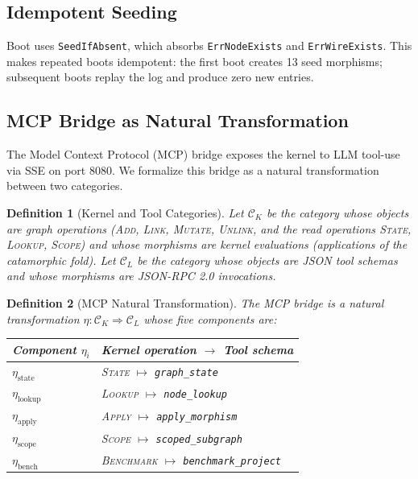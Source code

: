 \documentclass[submission,copyright,creativecommons]{eptcs}
\newtheorem{definition}{Definition}
\begin{document}
\subsection{Idempotent Seeding}

Boot uses \texttt{SeedIfAbsent}, which absorbs \texttt{ErrNodeExists} and
\texttt{ErrWireExists}. This makes repeated boots idempotent: the first boot
creates 13 seed morphisms; subsequent boots replay the log and produce zero
new entries.

\subsection{MCP Bridge as Natural Transformation}
\label{subsec:mcp-bridge}

The Model Context Protocol (MCP) bridge \cite{mcp2024} exposes the kernel to
LLM tool-use via SSE on port 8080. We formalize this bridge as a natural
transformation between two categories.

\begin{definition}[Kernel and Tool Categories]
Let $\mathcal{C}_K$ be the category whose objects are graph operations
(\textsc{Add}, \textsc{Link}, \textsc{Mutate}, \textsc{Unlink}, and the
read operations \textsc{State}, \textsc{Lookup}, \textsc{Scope}) and whose
morphisms are kernel evaluations (applications of the catamorphic fold). Let
$\mathcal{C}_L$ be the category whose objects are JSON tool schemas and whose
morphisms are JSON-RPC 2.0 invocations.
\end{definition}

\begin{definition}[MCP Natural Transformation]
The MCP bridge is a natural transformation $\eta\colon \mathcal{C}_K
\Rightarrow \mathcal{C}_L$ whose five components are:
\begin{center}
\begin{tabular}{@{}ll@{}}
\toprule
Component $\eta_i$ & Kernel operation $\to$ Tool schema \\
\midrule
$\eta_{\mathrm{state}}$     & \textsc{State} $\mapsto$ \texttt{graph\_state} \\
$\eta_{\mathrm{lookup}}$    & \textsc{Lookup} $\mapsto$ \texttt{node\_lookup} \\
$\eta_{\mathrm{apply}}$     & \textsc{Apply} $\mapsto$ \texttt{apply\_morphism} \\
$\eta_{\mathrm{scope}}$     & \textsc{Scope} $\mapsto$ \texttt{scoped\_subgraph} \\
$\eta_{\mathrm{bench}}$     & \textsc{Benchmark} $\mapsto$ \texttt{benchmark\_project} \\
\bottomrule
\end{tabular}
\end{center}
\end{definition}
\end{document}
